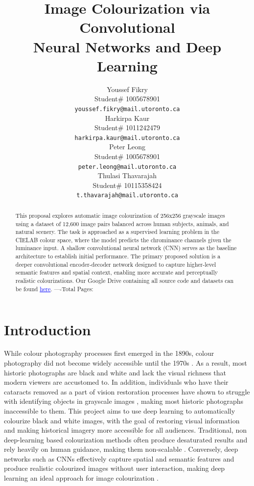 \documentclass{article} %
\title{Image Colourization via Convolutional \\
Neural Networks and Deep Learning}
\author{Youssef Fikry  \\
Student\# 1005678901\\
\texttt{youssef.fikry@mail.utoronto.ca} \\
\And Harkirpa Kaur  \\
Student\# 1011242479 \\
\texttt{harkirpa.kaur@mail.utoronto.ca} \\
\AND
Peter Leong \\
Student\# 1005678901 \\
\texttt{peter.leong@mail.utoronto.ca} \\
\And
Thulasi Thavarajah \\
Student\# 10115358424 \\
\texttt{t.thavarajah@mail.utoronto.ca} \\
\AND
}
\begin{document}
\maketitle

\begin{abstract}
This proposal explores automatic image colourization of 256x256 grayscale images using a dataset of 12,600 image pairs balanced across human subjects, animals, and natural scenery. 
The task is approached as a supervised learning problem in the CIELAB colour space, where the model predicts the chrominance channels given the luminance input. A shallow convolutional 
neural network (CNN) serves as the baseline architecture to establish initial performance. The primary proposed solution is a deeper convolutional encoder-decoder network designed to 
capture higher-level semantic features and spatial context, enabling more accurate and perceptually realistic colourizations. Our Google Drive containing all source code and datasets 
can be found \href{https://drive.google.com/drive/folders/1cV1NhlQ8UTk_CgJdwhqeRu0z5xE85ZsI?usp=sharing}{\textcolor{blue}{\uline{here}}}.
----Total Pages: \pageref{last_page}
\end{abstract}


\section{Introduction}

While colour photography processes first emerged in the 1890s, colour photography did not become widely accessible until the 1970s \cite{scienceandmediamuseum2020}. As a result, 
most historic photographs are black and white and lack the visual richness that modern viewers are accustomed to. In addition, individuals who have their cataracts 
removed as a part of vision restoration processes have shown to struggle with identifying objects in grayscale images \cite{vogelsang2024impact}, making most historic photographs 
inaccessible to them. This project aims to use deep learning to automatically colourize black and white images, with the goal of restoring visual information and 
making historical imagery more accessible for all audiences. Traditional, non deep-learning based colourization methods often produce desaturated results and rely 
heavily on human guidance, making them non-scalable \cite{cheng2016deepcolorization}. Conversely, deep networks such as CNNs effectively capture spatial and semantic features and produce 
realistic colourized images without user interaction, making deep learning an ideal approach for image colourization \cite{zhang2016colorful}.
\end{document}
